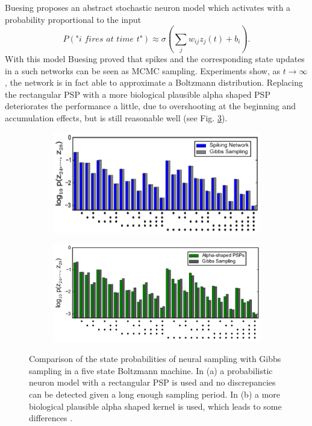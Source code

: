 Buesing proposes an abstract stochastic neuron model which activates with a probability proportional to the input
\[
P(\textit{"i fires at time t"}) \approx \sigma(\sum_j w_{ij} z_j(t) + b_i).
\]
With this model Buesing proved that spikes and the corresponding state updates in a such networks can be seen as MCMC sampling. Experiments show, as $t \rightarrow \infty$ , the network is in fact able to approximate a Boltzmann distribution.
Replacing the rectangular PSP with a more biological plausible alpha shaped PSP deteriorates the performance a little, due to overshooting at the beginning and accumulation effects, but is still reasonable well (see Fig. \ref{fig:snnsamp3}).

\begin{figure}
	\centering
	\begin{subfigure}[t]{.50\textwidth}
  		\centering
  		\includegraphics[width=.8\linewidth]{imgs/snn_sample3.png}
  		\caption{}
  		\label{fig:sub1}
	\end{subfigure}%
	\begin{subfigure}[t]{.50\textwidth}
  		\centering
  		\includegraphics[width=.8\linewidth]{imgs/snn_sample4.png}
  		\caption{}
  		\label{fig:sub2}
	\end{subfigure}
	\caption[Comparison of the state probabilities of neural sampling with Gibbs sampling.]{Comparison of the state probabilities of neural sampling with Gibbs sampling in a five state Boltzmann machine. In (a) a probabilistic neuron model with a rectangular PSP is used and no discrepancies can be detected given a long enough sampling period. In (b) a more biological plausible alpha shaped kernel is used, which leads to some differences \cite{Buesing2011}.}
	\label{fig:snnsamp3}
\end{figure}

